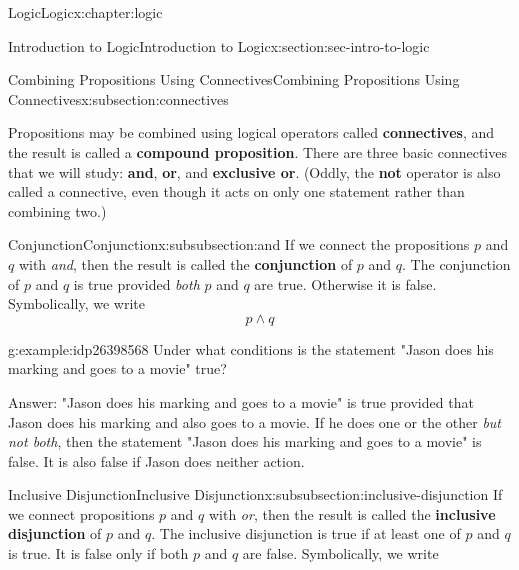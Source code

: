 \documentclass[twoside,10pt,]{book}
\newcommand{\terminology}[1]{\textbf{#1}}
\numberwithin{equation}{section}
\begin{document}
\begin{chapterptx}{Logic}{}{Logic}{}{}{x:chapter:logic}
\begin{sectionptx}{Introduction to Logic}{}{Introduction to Logic}{}{}{x:section:sec-intro-to-logic}
\typeout{************************************************}
%
\begin{subsectionptx}{Combining Propositions Using Connectives}{}{Combining Propositions Using Connectives}{}{}{x:subsection:connectives}
\begin{introduction}{}%
Propositions may be combined using logical operators called \terminology{connectives}, and the result is called a \terminology{compound proposition}.  There are three basic connectives that we will study: \terminology{and}, \terminology{or}, and \terminology{exclusive or}.  (Oddly, the \terminology{not} operator is also called a connective, even though it acts on only one statement rather than combining two.)\end{introduction}%
%
%
\typeout{************************************************}
\typeout{************************************************}
%
\begin{subsubsectionptx}{Conjunction}{}{Conjunction}{}{}{x:subsubsection:and}
If we connect the propositions \(p\) and \(q\) with \emph{and}, then the result is called the \terminology{conjunction} of \(p\) and \(q\).  The conjunction of \(p\) and \(q\) is true provided \emph{both} \(p\) and \(q\) are true.  Otherwise it is false. Symbolically, we write%
\begin{equation*}
p {\wedge} q
\end{equation*}
%
\begin{example}{}{g:example:idp26398568}%
Under what conditions is the statement "Jason does his marking and goes to a movie" true?%
\par
Answer: "Jason does his marking and goes to a movie" is true provided that Jason does his marking and also goes to a movie. If he does one or the other \emph{but not both}, then the statement "Jason does his marking and goes to a movie" is false.  It is also false if Jason does neither action.%
\end{example}
\end{subsubsectionptx}
%
%
\typeout{************************************************}
\typeout{************************************************}
%
\begin{subsubsectionptx}{Inclusive Disjunction}{}{Inclusive Disjunction}{}{}{x:subsubsection:inclusive-disjunction}
If we connect propositions \(p\) and \(q\) with \emph{or}, then the result is called the \terminology{inclusive disjunction} of \(p\) and \(q\).  The inclusive disjunction is true if at least one of \(p\) and \(q\) is true.  It is false only if both \(p\) and \(q\) are false.  Symbolically, we write%

\end{subsubsectionptx}
\end{subsectionptx}
\end{sectionptx}
\end{chapterptx}
\end{document}
